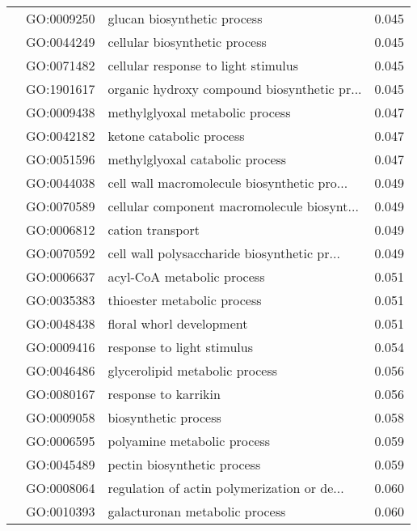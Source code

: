 \begin{longtable}{lllr}
   & GO:0009250 &                  glucan biosynthetic process &         0.045 \\
   & GO:0044249 &                cellular biosynthetic process &         0.045 \\
   & GO:0071482 &          cellular response to light stimulus &         0.045 \\
   & GO:1901617 &  organic hydroxy compound biosynthetic pr... &         0.045 \\
   & GO:0009438 &              methylglyoxal metabolic process &         0.047 \\
   & GO:0042182 &                     ketone catabolic process &         0.047 \\
   & GO:0051596 &              methylglyoxal catabolic process &         0.047 \\
   & GO:0044038 &  cell wall macromolecule biosynthetic pro... &         0.049 \\
   & GO:0070589 &  cellular component macromolecule biosynt... &         0.049 \\
   & GO:0006812 &                             cation transport &         0.049 \\
   & GO:0070592 &  cell wall polysaccharide biosynthetic pr... &         0.049 \\
   & GO:0006637 &                   acyl-CoA metabolic process &         0.051 \\
   & GO:0035383 &                  thioester metabolic process &         0.051 \\
   & GO:0048438 &                     floral whorl development &         0.051 \\
   & GO:0009416 &                   response to light stimulus &         0.054 \\
   & GO:0046486 &               glycerolipid metabolic process &         0.056 \\
   & GO:0080167 &                         response to karrikin &         0.056 \\
   & GO:0009058 &                         biosynthetic process &         0.058 \\
   & GO:0006595 &                  polyamine metabolic process &         0.059 \\
   & GO:0045489 &                  pectin biosynthetic process &         0.059 \\
   & GO:0008064 &  regulation of actin polymerization or de... &         0.060 \\
   & GO:0010393 &               galacturonan metabolic process &         0.060 \\

\end{longtable}
